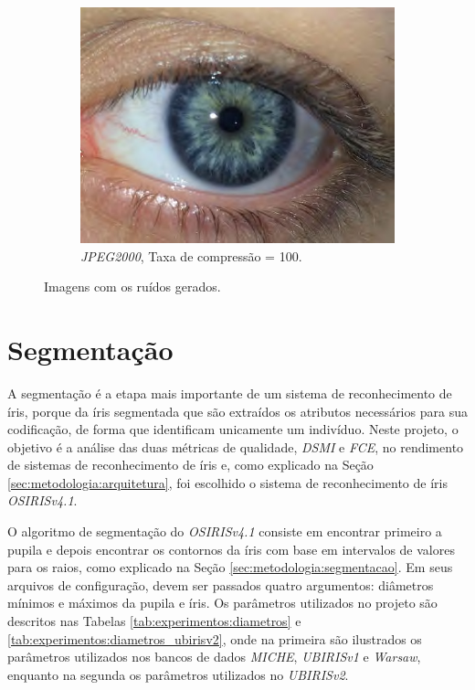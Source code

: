 \begin{figure}[H]
\begin{subfigure}{0.25\textwidth}
  \includegraphics[width=\linewidth]{img/Resultados/ruidos/jpeg2000_100.jpg}
  \caption{\textit{JPEG2000}, Taxa de compressão = 100.}
\end{subfigure}
\caption{Imagens com os ruídos gerados.}
\label{fig:experimentos:ruidos}
\end{figure}

\FloatBarrier

\section{Segmentação} \label{sec:experimentos:segmentacao}

\par A segmentação é a etapa mais importante de um sistema de reconhecimento de íris, porque da íris segmentada que são extraídos os atributos necessários para sua codificação, de forma que identificam unicamente um indivíduo. Neste projeto, o objetivo é a análise das duas métricas de qualidade, \textit{\acrshort{DSMI}} e \textit{\acrshort{FCE}}, no rendimento de sistemas de reconhecimento de íris e, como explicado na Seção \ref{sec:metodologia:arquitetura}, foi escolhido o sistema de reconhecimento de íris \textit{OSIRISv4.1}. 

\par O algoritmo de segmentação do \textit{OSIRISv4.1} consiste em encontrar primeiro a pupila e depois encontrar os contornos da íris com base em intervalos de valores para os raios, como explicado na Seção \ref{sec:metodologia:segmentacao}. Em seus arquivos de configuração, devem ser passados quatro argumentos: diâmetros mínimos e máximos da pupila e íris. Os parâmetros utilizados no projeto são descritos nas Tabelas \ref{tab:experimentos:diametros} e \ref{tab:experimentos:diametros_ubirisv2}, onde na primeira são ilustrados os parâmetros utilizados nos bancos de dados \textit{MICHE}, \textit{UBIRISv1} e \textit{\acrshort{Warsaw}}, enquanto na segunda os parâmetros utilizados no \textit{UBIRISv2}.

